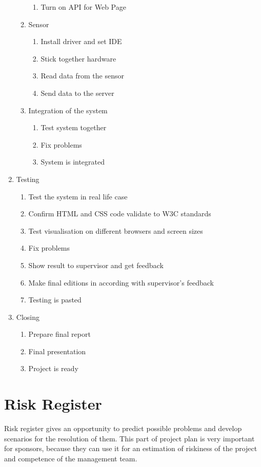 \documentclass[english]{article}
\begin{document}
\begin{enumerate}
\begin{enumerate}[label*=\arabic*]
\begin{enumerate}[label*=\arabic*]
		\item Turn on API for Web Page
		\end{enumerate}
	\item Sensor
		\begin{enumerate}[label*=\arabic*]
		\item Install driver and set IDE
		\item Stick together hardware
		\item Read data from the sensor
		\item Send data to the server
		\end{enumerate}
	\item Integration of the system
		\begin{enumerate}[label*=\arabic*]
		\item Test system together
		\item Fix problems
		\item System is integrated
		\end{enumerate}
	\end{enumerate}
\item Testing
	\begin{enumerate}[label*=\arabic*]
	\item Test the system in real life case
	\item Confirm HTML and CSS code validate to W3C standards
	\item Test visualisation on different browsers and screen sizes
	\item Fix problems
	\item Show result to supervisor and get feedback
	\item Make final editions in according with supervisor's feedback
	\item Testing is pasted
	\end{enumerate}
\item Closing 
	\begin{enumerate}[label*=\arabic*]
	\item Prepare final report
	\item Final presentation
	\item Project is ready
	\end{enumerate}
\end{enumerate}

\section{Risk Register}

Risk register gives an opportunity to predict possible problems and develop scenarios for the resolution of them. This part of project plan is very important for sponsors, because they can use it for an estimation of riskiness of the project and competence of the management team.\cite{man}\\
\end{document}
